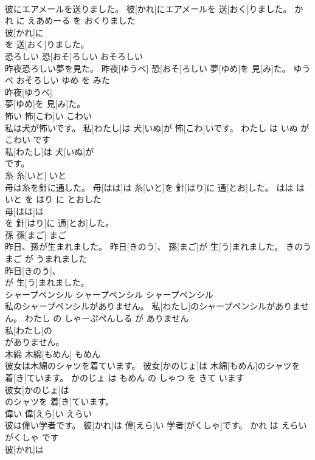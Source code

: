 \documentclass[8pt]{extreport}
\begin{document}
\begin{CJK}{UTF8}{min}
\\	彼にエアメールを送りました。	彼[かれ]にエアメールを 送[おく]りました。	かれ に えあめーる を おくりました	
\\	彼[かれ]に
\\	を 送[おく]りました。		
\\	恐ろしい	恐[おそ]ろしい	おそろしい	
\\	昨夜恐ろしい夢を見た。	昨夜[ゆうべ] 恐[おそ]ろしい 夢[ゆめ]を 見[み]た。	ゆうべ おそろしい ゆめ を みた	
\\	昨夜[ゆうべ]
\\	夢[ゆめ]を 見[み]た。		
\\	怖い	怖[こわ]い	こわい	
\\	私は犬が怖いです。	私[わたし]は 犬[いぬ]が 怖[こわ]いです。	わたし は いぬ が こわい です	
\\	私[わたし]は 犬[いぬ]が
\\	です。		
\\	糸	糸[いと]	いと	
\\	母は糸を針に通した。	母[はは]は 糸[いと]を 針[はり]に 通[とお]した。	はは は いと を はり に とおした	
\\	母[はは]は
\\	を 針[はり]に 通[とお]した。		
\\	孫	孫[まご]	まご	
\\	昨日、孫が生まれました。	昨日[きのう]、 孫[まご]が 生[う]まれました。	きのう まご が うまれました	
\\	昨日[きのう]、
\\	が 生[う]まれました。		
\\	シャープペンシル	シャープペンシル	シャープペンシル	
\\	私のシャープペンシルがありません。	私[わたし]のシャープペンシルがありません。	わたし の しゃーぷぺんしる が ありません	
\\	私[わたし]の
\\	がありません。		
\\	木綿	木綿[もめん]	もめん	
\\	彼女は木綿のシャツを着ています。	彼女[かのじょ]は 木綿[もめん]のシャツを 着[き]ています。	かのじょ は もめん の しゃつ を きて います	
\\	彼女[かのじょ]は
\\	のシャツを 着[き]ています。		
\\	偉い	偉[えら]い	えらい	
\\	彼は偉い学者です。	彼[かれ]は 偉[えら]い 学者[がくしゃ]です。	かれ は えらい がくしゃ です	
\\	彼[かれ]は

\end{CJK}
\end{document}

